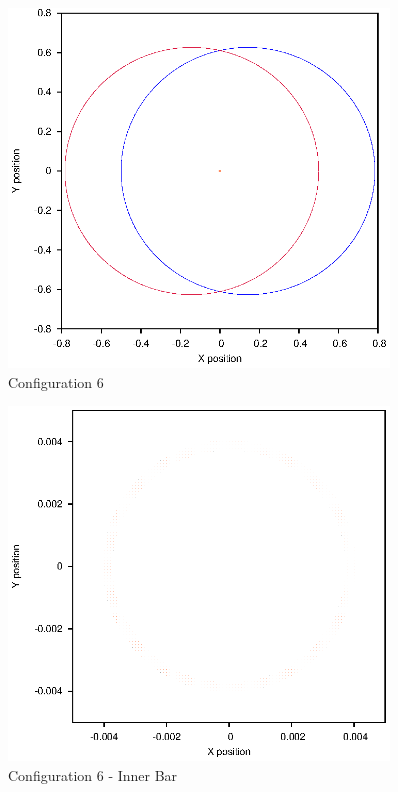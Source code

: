 \documentclass[a4paper,12pt]{article}
\begin{document}
\begin{figure}[H]
\centering
\includegraphics[width=0.9\textwidth]{./2016results/004-57-004/Orbit.eps}
\caption{Configuration 6}
\label{fig:config6}
\end{figure}
\begin{figure}[H]
\centering
\includegraphics[width=0.9\textwidth]{./2016results/004-57-004/Inner.eps}
\caption{Configuration 6 - Inner Bar}
\label{fig:config6i}
\end{figure}
\end{document}
